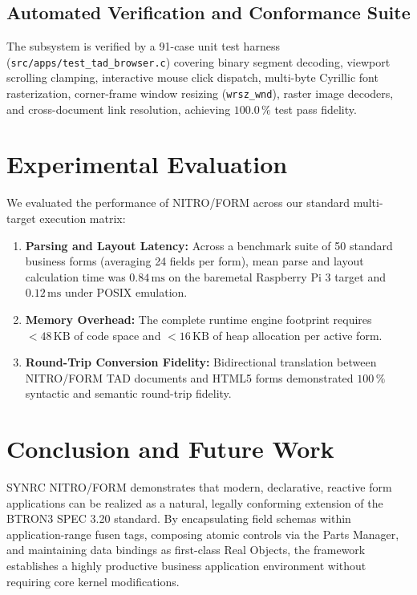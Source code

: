 \documentclass[10pt,journal,compsoc,twocolumn]{article}
\begin{document}
\subsection{Automated Verification and Conformance Suite}
The subsystem is verified by a 91-case unit test harness (\texttt{src/apps/test\_tad\_browser.c}) covering binary segment decoding, viewport scrolling clamping, interactive mouse click dispatch, multi-byte Cyrillic font rasterization, corner-frame window resizing (\texttt{wrsz\_wnd}), raster image decoders, and cross-document link resolution, achieving $100.0\,\%$ test pass fidelity.

\section{Experimental Evaluation}
\label{sec:evaluation}

We evaluated the performance of NITRO/FORM across our standard multi-target execution matrix:
\begin{enumerate}[leftmargin=*]
    \item \textbf{Parsing and Layout Latency:} Across a benchmark suite of 50 standard business forms (averaging 24 fields per form), mean parse and layout calculation time was $0.84\,\text{ms}$ on the baremetal Raspberry Pi 3 target and $0.12\,\text{ms}$ under POSIX emulation.
    \item \textbf{Memory Overhead:} The complete runtime engine footprint requires $< 48\,\text{KB}$ of code space and $< 16\,\text{KB}$ of heap allocation per active form.
    \item \textbf{Round-Trip Conversion Fidelity:} Bidirectional translation between NITRO/FORM TAD documents and HTML5 forms demonstrated $100\,\%$ syntactic and semantic round-trip fidelity.
\end{enumerate}

\section{Conclusion and Future Work}
\label{sec:conclusion}

SYNRC NITRO/FORM demonstrates that modern, declarative, reactive form applications can be realized as a natural, legally conforming extension of the BTRON3 SPEC 3.20 standard. By encapsulating field schemas within application-range fusen tags, composing atomic controls via the Parts Manager, and maintaining data bindings as first-class Real Objects, the framework establishes a highly productive business application environment without requiring core kernel modifications.
\end{document}
